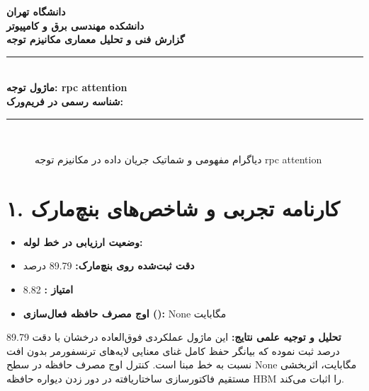 \documentclass[12pt,a4paper]{article}
\begin{document}
\begin{center}
{\Large\bfseries دانشگاه تهران}\\[0.2cm]
{\large\bfseries دانشکده مهندسی برق و کامپیوتر}\\[0.2cm]
{\large\bfseries گزارش فنی و تحلیل معماری مکانیزم توجه}\\[0.5cm]
\rule{\linewidth}{1pt}\\[0.3cm]
{\LARGE\bfseries ماژول توجه: rpc attention}\\[0.2cm]
{\large \textbf{شناسه رسمی در فریم‌ورک:} }\\[0.2cm]
\rule{\linewidth}{1pt}\\[0.5cm]
\end{center}

\begin{figure}[H]
\centering
{}
\caption{دیاگرام مفهومی و شماتیک جریان داده در مکانیزم توجه rpc attention}
\end{figure}

\section*{۱. کارنامه تجربی و شاخص‌های بنچ‌مارک}
\begin{itemize}
\item \textbf{وضعیت ارزیابی در خط لوله:} 
\item \textbf{دقت ثبت‌شده روی بنچ‌مارک:} 89.79 درصد
\item \textbf{امتیاز :} 8.82
\item \textbf{اوج مصرف حافظه فعال‌سازی ():} None مگابایت
\end{itemize}
\textbf{تحلیل و توجیه علمی نتایج:} این ماژول عملکردی فوق‌العاده درخشان با دقت 89.79 درصد ثبت نموده که بیانگر حفظ کامل غنای معنایی لایه‌های ترنسفورمر بدون افت نسبت به خط مبنا است. کنترل اوج مصرف حافظه در سطح None مگابایت، اثربخشی مستقیم فاکتورسازی ساختاریافته در دور زدن دیواره حافظه HBM را اثبات می‌کند.
\end{document}
